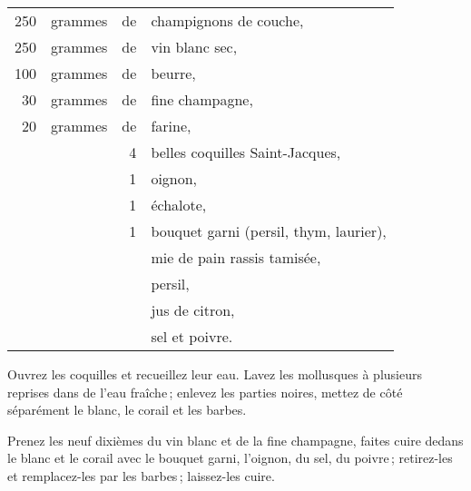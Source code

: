 \footnotesize
\begin{longtable}{rrrp{16em}}
  250 & grammes    & de & champignons de couche,                                                          \\
  250 & grammes    & de & vin blanc sec,                                                                  \\
  100 & grammes    & de & beurre,                                                                         \\
   30 & grammes    & de & fine champagne,                                                                 \\
   20 & grammes    & de & farine,                                                                         \\
      &            &  4 & belles coquilles Saint-Jacques,                                                 \\
      &            &  1 & oignon,                                                                         \\
      &            &  1 & échalote,                                                                       \\
      &            &  1 & bouquet garni (persil, thym, laurier),                                          \\
      &            &    & mie de pain rassis tamisée,                                                     \\
      &            &    & persil,                                                                         \\
      &            &    & jus de citron,                                                                  \\
      &            &    & sel et poivre.                                                                  \\
\end{longtable}
\normalsize

Ouvrez les coquilles et recueillez leur eau. Lavez les mollusques à plusieurs
reprises dans de l'eau fraîche ; enlevez les parties noires, mettez de côté
séparément le blanc, le corail et les barbes.

Prenez les neuf dixièmes du vin blanc et de la fine champagne, faites cuire
dedans le blanc et le corail avec le bouquet garni, l'oignon, du sel, du
poivre ; retirez-les et remplacez-les par les barbes ; laissez-les cuire.

